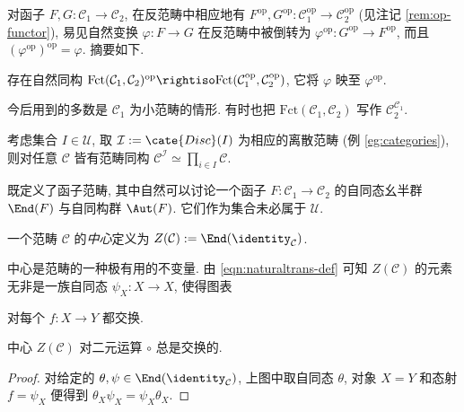 对函子 $F, G : \mathcal{C}_1 \to \mathcal{C}_2$, 在反范畴中相应地有 $F^\text{op}, G^\text{op}: \mathcal{C}_1^\text{op} \to \mathcal{C}_2^\text{op}$ (见注记 \ref{rem:op-functor}), 易见自然变换 $\varphi: F \to G$ 在反范畴中被倒转为 $\varphi^\text{op}: G^\text{op} \to F^\text{op}$, 而且 $(\varphi^{\text{op}})^{\text{op}} = \varphi$.  摘要如下.

\begin{proposition}\label{prop:op-functor-cat}
	存在自然同构 $\text{Fct}(\mathcal{C}_1, \mathcal{C}_2)^\text{op} \rightiso \text{Fct}(\mathcal{C}_1^{\text{op}}, \mathcal{C}_2^{\text{op}})$, 它将 $\varphi$ 映至 $\varphi^\text{op}$. 
\end{proposition}

今后用到的多数是 $\mathcal{C}_1$ 为小范畴的情形. 有时也把 $\text{Fct}(\mathcal{C}_1, \mathcal{C}_2)$ 写作 $\mathcal{C}_2^{\mathcal{C}_1}$.
\begin{example}
	考虑集合 $I \in \mathcal{U}$, 取 $\mathcal{I} := \cate{Disc}(I)$ 为相应的离散范畴 (例 \ref{eg:categories}), 则对任意 $\mathcal{C}$ 皆有范畴同构 $\mathcal{C}^{\mathcal{I}} \simeq \prod_{i \in I} \mathcal{C}$.
\end{example}

既定义了函子范畴, 其中自然可以讨论一个函子 $F: \mathcal{C}_1 \to \mathcal{C}_2$ 的自同态幺半群 $\End(F)$ 与自同构群 $\Aut(F)$. 它们作为集合未必属于 $\mathcal{U}$.
\begin{definition}\label{def:cat-center}
	一个范畴 $\mathcal{C}$ 的\emph{中心}定义为 $Z(\mathcal{C}) := \End(\identity_{\mathcal{C}})$.
\end{definition}

中心是范畴的一种极有用的不变量. 由 \eqref{eqn:naturaltrans-def} 可知 $Z(\mathcal{C})$ 的元素无非是一族自同态 $\psi_X: X \to X$, 使得图表
对每个 $f: X \to Y$ 都交换.

\begin{proposition}
	中心 $Z(\mathcal{C})$ 对二元运算 $\circ$ 总是交换的.
\end{proposition}
\begin{proof}
	对给定的 $\theta, \psi \in \End(\identity_{\mathcal{C}})$, 上图中取自同态 $\theta$, 对象 $X=Y$ 和态射$f = \psi_X$ 便得到 $\theta_X \psi_X = \psi_X \theta_X$.
\end{proof}

